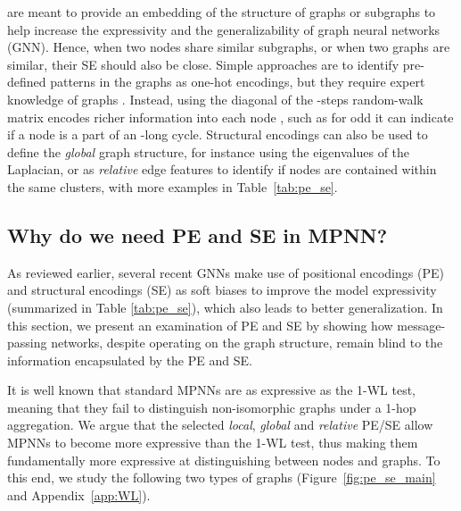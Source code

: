 \documentclass{article}
\begin{document}
 are meant to provide an embedding of the structure of graphs or subgraphs to help increase the expressivity and the generalizability of graph neural networks (GNN). Hence, when two nodes share similar subgraphs, or when two graphs are similar, their SE should also be close. Simple approaches are to identify pre-defined patterns in the graphs as one-hot encodings, but they require expert knowledge of graphs \cite{bouritsas2022improving_GSN, bodnar2021weisfeiler_CIN}. Instead, using the diagonal of the -steps random-walk matrix encodes richer information into each node \cite{dwivedi2022LPE}, such as for odd  it can indicate if a node is a part of an -long cycle. Structural encodings can also be used to define the \textit{global} graph structure, for instance using the eigenvalues of the Laplacian, or as \textit{relative} edge features to identify if nodes are contained within the same clusters, with more examples in Table~\ref{tab:pe_se}.


\subsection{Why do we need PE and SE in MPNN?}
\label{sec:need_pe_se}
As reviewed earlier, several recent GNNs make use of positional encodings (PE) and structural encodings (SE) as soft biases to improve the model expressivity (summarized in Table \ref{tab:pe_se}), which also leads to better generalization. In this section, we present an examination of PE and SE by showing how message-passing networks, despite operating on the graph structure, remain blind to the information encapsulated by the PE and SE.

It is well known that standard MPNNs are as expressive as the 1-WL test, meaning that they fail to distinguish non-isomorphic graphs under a 1-hop aggregation. We argue that the selected \textit{local}, \textit{global} and \textit{relative} PE/SE allow MPNNs to become more expressive than the 1-WL test, thus making them fundamentally more expressive at distinguishing between nodes and graphs.
To this end, we study the following two types of graphs (Figure~\ref{fig:pe_se_main} and Appendix~\ref{app:WL}).
\end{document}
